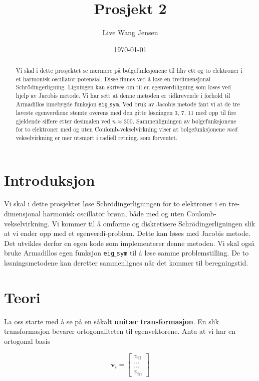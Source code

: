 \documentclass{article}
\title{Prosjekt 2}
\author{Live Wang Jensen}
\date{\today}
\begin{document}
\maketitle

\begin{abstract}
Vi skal i dette prosjektet se nærmere på bølgefunksjonene til hhv ett og to elektroner i et harmonisk-oscillator potensial. Disse finnes ved å løse en tredimensjonal Schrödingerligning. Ligningen kan skrives om til en egenverdiligning som løses ved hjelp av Jacobis metode. Vi har sett at denne metoden er tidkrevende i forhold til Armadillos innebygde funksjon \texttt{eig$\_$sym}. Ved bruk av Jacobis metode fant vi at de tre laveste egenverdiene stemte overens med den gitte løsningen {3, 7, 11} med opp til fire gjeldende siffere etter desimalen ved $n \approx 300$. Sammenligningen av bølgefunksjonene for to elektroner med og uten Coulomb-vekselvirkning viser at bølgefunksjonene \textit{med} vekselvirkning er mer utsmørt i radiell retning, som forventet. 

\end{abstract}

\section{Introduksjon}
Vi skal i dette prosjektet løse Schrödingerligningen for to elektroner i en tre-dimensjonal harmonisk oscillator brønn, både med og uten Coulomb-vekselvirkning. Vi kommer til å omforme og diskretisere Schrödingerligningen slik at vi ender opp med et egenverdi-problem. Dette kan løses med Jacobis metode. Det utvikles derfor en egen kode som implementerer denne metoden. Vi skal også bruke Armadillos egen funksjon \texttt{eig$\_$sym} til å løse samme problemstilling. De to løsningsmetodene kan deretter sammenlignes når det kommer til beregningstid.

\section{Teori}
La oss starte med å se på en såkalt \textbf{unitær transformasjon}. En slik transformasjon bevarer ortogonaliteten til egenvektorene. Anta at vi har en ortogonal basis

\[ \textbf{v}_i = \begin{bmatrix} v_{i1} \\
												\dots \\
												\dots \\
												v_{in}
												\end{bmatrix}   \]
												
\end{document}

